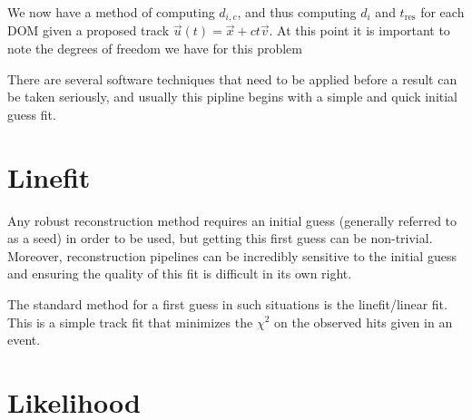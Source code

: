 We now have a method of computing $d_{i,c}$, and thus computing $d_{i}$ and $t_{\text{res}}$ for each DOM given a proposed track $\vec{u}(t) = \vec{x} + ct\vec{v}$. At this point it is important to note the degrees of freedom we have for this problem

There are several software techniques that need to be applied before a result can be taken seriously, and usually this pipline begins with a simple and quick initial guess fit. 

\section{Linefit}

Any robust reconstruction method requires an initial guess (generally referred to as a seed) in order to be used, but getting this first guess can be non-trivial. Moreover, reconstruction pipelines can be incredibly sensitive to the initial guess and ensuring the quality of this fit is difficult in its own right.

The standard method for a first guess in such situations is the linefit/linear fit. This is a simple track fit that minimizes the $\chi^{2}$ on the observed hits given in an event. 


\section{Likelihood}


